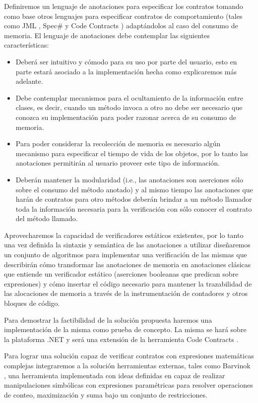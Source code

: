 \documentclass[12pt,a4paper]{article}
\begin{document}
			Definiremos un lenguaje de anotaciones para especificar los contratos tomando como base otros lenguajes para especificar contratos de comportamiento (tales como JML \cite{JML}, Spec\# \cite{specsharp} y Code Contracts \cite{codecontracts}) adaptándolos al caso del consumo de memoria. El lenguaje de anotaciones debe contemplar las siguientes características:
			\begin{itemize}
				\item
					Deberá ser intuitivo y cómodo para su uso por parte del usuario, esto en parte estará asociado a la implementación hecha como explicaremos más adelante.
				\item
					Debe contemplar mecanismos para el ocultamiento de la información entre clases, es decir, cuando un método invoca a otro no debe ser necesario que conozca su implementación para poder razonar acerca de su consumo de memoria.
				\item
					Para poder considerar la recolección de memoria es necesario algún mecanismo para especificar el tiempo de vida de los objetos, por lo tanto las anotaciones permitirán al usuario proveer este tipo de información.
				\item
					Deberán mantener la modularidad (i.e., las anotaciones son aserciones sólo sobre el consumo del método anotado) y al mismo tiempo las anotaciones que harán de contratos para otro métodos deberán brindar a un método llamador toda la información necesaria para la verificación con sólo conocer el contrato del método llamado.
			\end{itemize}

			Aprovecharemos la capacidad de verificadores estáticos existentes, por lo tanto una vez definida la sintaxis y semántica de las anotaciones a utilizar diseñaremos un conjunto de algoritmos para implementar una verificación de las mismas que describirán cómo transformar las anotaciones de memoria en anotaciones clásicas que entiende un verificador estático (aserciones booleanas que predican sobre expresiones) y cómo insertar el código necesario para mantener la trazabilidad de las alocaciones de memoria a través de la instrumentación de contadores y otros bloques de código.

			Para demostrar la factibilidad de la solución propuesta haremos una implementación de la misma como prueba de concepto. La misma se hará sobre la plataforma .NET y será una extensión de la herramienta Code Contracts \cite{codecontracts}.

			Para lograr una solución capaz de verificar contratos con expresiones matemáticas complejas integraremos a la solución herramientas externas, tales como Barvinok \cite{barvinok}, una herramienta implementada con ideas definidas en \cite{Ct04} capaz de realizar manipulaciones simbólicas con expresiones paramétricas para resolver operaciones de conteo, maximización y suma bajo un conjunto de restricciones.
\end{document}
